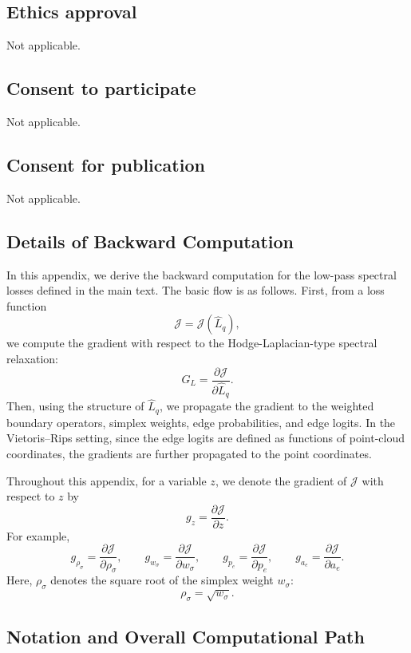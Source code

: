 \documentclass[pdflatex,sn-mathphys-ay]{sn-jnl}%
\theoremstyle{thmstyleone}%
\theoremstyle{thmstyletwo}%
\theoremstyle{thmstylethree}%
\begin{document}
\subsection*{Ethics approval}
Not applicable.

\subsection*{Consent to participate}
Not applicable.

\subsection*{Consent for publication}
Not applicable.


\begin{appendices}


\section{Details of Backward Computation}
\label{app:backward}

In this appendix, we derive the backward computation for the low-pass spectral losses defined in the main text.
The basic flow is as follows. First, from a loss function
\[
\mathcal{J}
=
\mathcal{J}(\widehat{L}_q),
\]
we compute the gradient with respect to the Hodge-Laplacian-type spectral relaxation:
\[
G_L
=
\frac{\partial \mathcal{J}}{\partial \widehat{L}_q}.
\]
Then, using the structure of \(\widehat{L}_q\), we propagate the gradient to the weighted boundary operators, simplex weights, edge probabilities, and edge logits. In the Vietoris--Rips setting, since the edge logits are defined as functions of point-cloud coordinates, the gradients are further propagated to the point coordinates.

Throughout this appendix, for a variable \(z\), we denote the gradient of \(\mathcal{J}\) with respect to \(z\) by
\[
g_z
=
\frac{\partial \mathcal{J}}{\partial z}.
\]
For example,
\[
g_{\rho_\sigma}
=
\frac{\partial \mathcal{J}}{\partial \rho_\sigma},
\qquad
g_{w_\sigma}
=
\frac{\partial \mathcal{J}}{\partial w_\sigma},
\qquad
g_{p_e}
=
\frac{\partial \mathcal{J}}{\partial p_e},
\qquad
g_{a_e}
=
\frac{\partial \mathcal{J}}{\partial a_e}.
\]
Here, \(\rho_\sigma\) denotes the square root of the simplex weight \(w_\sigma\):
\[
\rho_\sigma=\sqrt{w_\sigma}.
\]

\subsection{Notation and Overall Computational Path}


\end{appendices}
\end{document}
